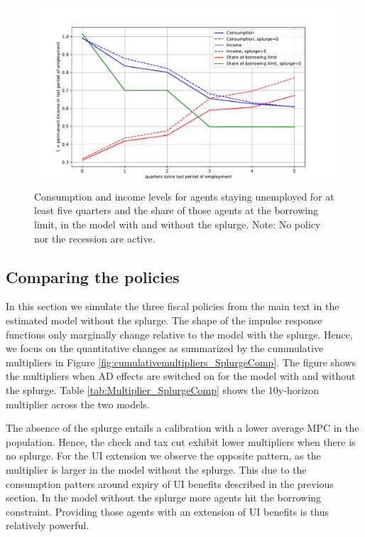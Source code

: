 \documentclass[\econtexRoot/HAFiscal]{subfiles}
\begin{document}
\begin{figure}[t]
	\centering
	\includegraphics[width=0.8\linewidth]{Code/HA-Models/FromPandemicCode/Figures/Splurge0/UIextension_CompSplurge0}
	\caption{Consumption and income levels for agents staying unemployed for at least five quarters and the share of those agents at the borrowing limit, in the model with and without the splurge. Note: No policy nor the recession are active.}
	\notinsubfile{\label{fig:UIextension_CompSplurge0}}
\end{figure}


\subsection{Comparing the policies}

In this section we simulate the three fiscal policies from the main text in the estimated model without the splurge. The shape of the impulse response functions only marginally change relative to the model with the splurge. Hence, we focus on the quantitative changes as summarized by the cummulative multipliers in Figure \ref{fig:cumulativemultipliers_SplurgeComp}. The figure shows the multipliers when AD effects are switched on for the model with and without the splurge. Table \ref{tab:Multiplier_SplurgeComp} shows the 10y-horizon multiplier across the two models.

The absence of the splurge entails a calibration with a lower average MPC in the population. Hence, the check and tax cut exhibit lower multipliers when there is no splurge. For the UI extension we observe the opposite pattern, as the multiplier is larger in the model without the splurge. This due to the consumption patters around expiry of UI benefits described in the previous section. In the model without the splurge more agents hit the borrowing constraint. Providing those agents with an extension of UI benefits is thus relatively powerful. 
\end{document}
